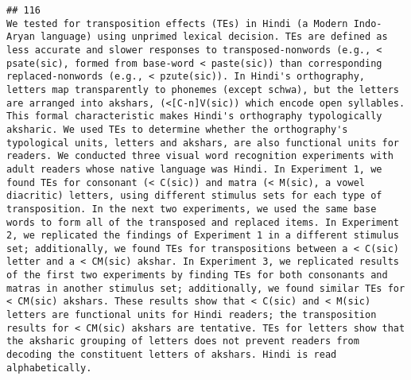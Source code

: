 \documentclass[
  english,
  man]{apa6}
\begin{document}
\begin{verbatim}
## 116                                                                                                                                                                                                                                                                                                                                                                                                                                                                                                                                                                                                                                                                                                                                                                                                                                       We tested for transposition effects (TEs) in Hindi (a Modern Indo-Aryan language) using unprimed lexical decision. TEs are defined as less accurate and slower responses to transposed-nonwords (e.g., < psate(sic), formed from base-word < paste(sic)) than corresponding replaced-nonwords (e.g., < pzute(sic)). In Hindi's orthography, letters map transparently to phonemes (except schwa), but the letters are arranged into akshars, (<[C-n]V(sic)) which encode open syllables. This formal characteristic makes Hindi's orthography typologically aksharic. We used TEs to determine whether the orthography's typological units, letters and akshars, are also functional units for readers. We conducted three visual word recognition experiments with adult readers whose native language was Hindi. In Experiment 1, we found TEs for consonant (< C(sic)) and matra (< M(sic), a vowel diacritic) letters, using different stimulus sets for each type of transposition. In the next two experiments, we used the same base words to form all of the transposed and replaced items. In Experiment 2, we replicated the findings of Experiment 1 in a different stimulus set; additionally, we found TEs for transpositions between a < C(sic) letter and a < CM(sic) akshar. In Experiment 3, we replicated results of the first two experiments by finding TEs for both consonants and matras in another stimulus set; additionally, we found similar TEs for < CM(sic) akshars. These results show that < C(sic) and < M(sic) letters are functional units for Hindi readers; the transposition results for < CM(sic) akshars are tentative. TEs for letters show that the aksharic grouping of letters does not prevent readers from decoding the constituent letters of akshars. Hindi is read alphabetically.

\end{verbatim}
\end{document}
